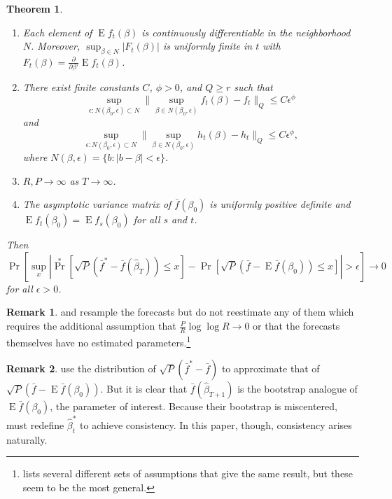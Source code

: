 \documentclass[11pt,fleqn]{article}
\newtheorem{thm}{Theorem}
\theoremstyle{definition}
\newtheorem{rem}{Remark}
\DeclareMathOperator{\E}{E}
\DeclareMathOperator{\pr}{Pr}
\newcommand{\dd}[1]{\frac{\partial}{\partial #1}}
\begin{document}
\begin{thm}
\begin{enumerate}
    $\| \sup_{\beta \in N} f_{t}(\beta) \|_{r+\delta}$ and $\|
    \sup_{\beta \in N} h_{t}(\beta) \|_{r+\delta}$ are uniformly
    finite in $t$, where $N$ is an open neighborhood of $\beta_{0}$.
  \item Each element of $\E f_{t}(\beta)$ is continuously
    differentiable in the neighborhood $N$.  Moreover, $\sup_{\beta
      \in N} | F_{t}(\beta) |$ is uniformly finite in $t$ with
    $F_{t}(\beta) = \dd{\beta'} \E f_{t}(\beta)$.
  \item There exist finite constants $C$, $\phi > 0$, and $Q \geq r$
    such that \[\sup_{\epsilon : N(\beta_{0}, \epsilon) \subset N}\|
    \sup_{\beta \in N(\beta_{0}, \epsilon)} f_{t}(\beta) - f_{t} \|_Q
    \leq C \epsilon^{\phi}\] and \[\sup_{\epsilon : N(\beta_{0},
      \epsilon) \subset N}\| \sup_{\beta \in N(\beta_{0}, \epsilon)}
    h_{t}(\beta) - h_{t} \|_Q \leq C \epsilon^{\phi},\] where
    $N(\beta, \epsilon) = \{b : |b - \beta| < \epsilon\}$.
  \item $R, P \to \infty$ as $T \to \infty$.
  \item The asymptotic variance matrix of $\bar{f}(\beta_0)$ is
    uniformly positive definite and $\E f_t(\beta_0) = \E
    f_s(\beta_0)$ for all $s$ and $t$.
  \end{enumerate}
  Then
  \begin{equation}
    \pr[\sup_x | \pr^*[\sqrt{P} (\bar{f}^* - \bar{f}(\hat{\beta}_{T}))
        \leq x] - \pr[\sqrt{P}( \bar{f} - \E \bar{f}(\beta_0)) \leq x] | >
      \epsilon] \to 0
  \end{equation}
  for all $\epsilon > 0$.
\end{thm}

\begin{rem}
  \citet{Whi:00} and \citet{Han:05} resample the forecasts but do not
  reestimate any of them which requires the additional assumption that
  $\tfrac{P}{R} \log \log R \to 0$ or that the forecasts themselves
  have no estimated parameters.\footnote{\citet{Whi:00} lists several
    different sets of assumptions that give the same result, but these
    seem to be the most general.}
\end{rem}

\begin{rem}
  \citet{CoS:07} use the distribution of $\sqrt{P}(\bar{f}^{*} -
  \bar{f})$ to approximate that of $\sqrt{P}(\bar{f} - \E
  \bar{f}(\beta_0))$.  But it is clear that
  $\bar{f}(\hat{\beta}_{T+1})$ is the bootstrap analogue of $\E
  \bar{f}(\beta_0)$, the parameter of interest.  Because their
  bootstrap is miscentered, \citet{CoS:07} must redefine
  $\hat{\beta}_t^{*}$ to achieve consistency.  In this paper, though,
  consistency arises naturally.
\end{rem}
\end{document}
